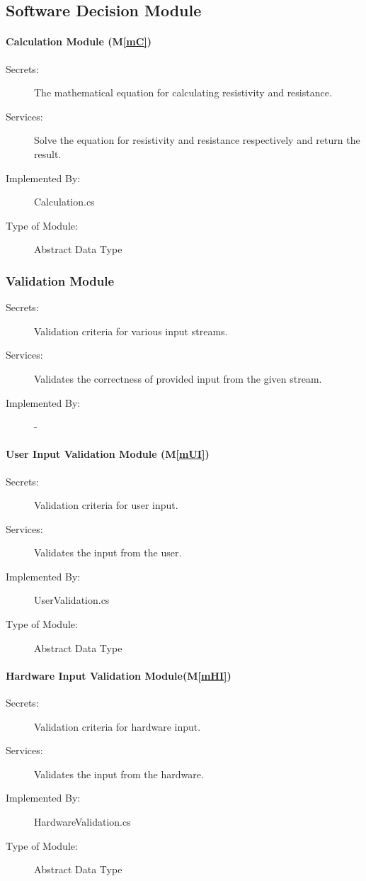 \documentclass[12pt, titlepage]{article}
\newcommand{\mref}[1]{M\ref{#1}}
\begin{document}
\subsection{Software Decision Module}

\paragraph{Calculation Module (\mref{mC})}
\begin{description}
  \item[Secrets:] The mathematical equation for calculating resistivity and resistance.
  \item[Services:]Solve the equation for resistivity and resistance respectively and return the result.
  \item[Implemented By:] Calculation.cs 
  \item[Type of Module:] Abstract Data Type
\end{description}

\subsubsection{Validation Module}
\begin{description}
  \item[Secrets:] Validation criteria for various input streams.
  \item[Services:]Validates the correctness of provided input from the given stream.
  \item[Implemented By:] -
\end{description}

\paragraph{User Input Validation Module (\mref{mUI})}
\begin{description}
  \item[Secrets:] Validation criteria for user input.
  \item[Services:] Validates the input from the user.
  \item[Implemented By:] UserValidation.cs 
  \item[Type of Module:] Abstract Data Type
\end{description}

\paragraph{Hardware Input Validation Module(\mref{mHI})}
\begin{description}
  \item[Secrets:] Validation criteria for hardware input.
  \item[Services:] Validates the input from the hardware.
  \item[Implemented By:] HardwareValidation.cs 
  \item[Type of Module:] Abstract Data Type
\end{description}
\end{document}
